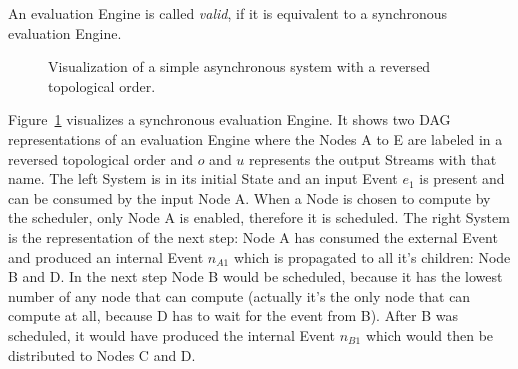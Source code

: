 \begin{definition}[name = Valid evaluation Engines]\label{def:valid_eval_engine}
  An evaluation Engine is called \emph{valid}, if it is equivalent to a synchronous evaluation Engine.
\end{definition}


\begin{figure}
  \caption{Visualization of a simple asynchronous system with a reversed topological order.}
\label{fig:chap3:sec_sync:visual_dag}
\end{figure}

Figure~\ref{fig:chap3:sec_sync:visual_dag} visualizes a synchronous evaluation Engine.
It shows two DAG representations of an evaluation Engine  where the Nodes A to E are labeled in a reversed topological order and \(o\) and \(u\) represents the output Streams with that name.
The left System is in its initial State and an input Event \(e_1\) is present and can be consumed by the input Node A.
When a Node is chosen to compute by the scheduler, only Node A is enabled, therefore it is scheduled.
The right System is the representation of the next step: Node A has consumed the external Event and produced an internal Event \(n_{A1}\) which is propagated to all it's children: Node B and D.
In the next step Node B would be scheduled, because it has the lowest number of any node that can compute (actually it's the only node that can compute at all, because D has to wait for the event from B).
After B was scheduled, it would have produced the internal Event \(n_{B1}\) which would then be distributed to Nodes C and D.

